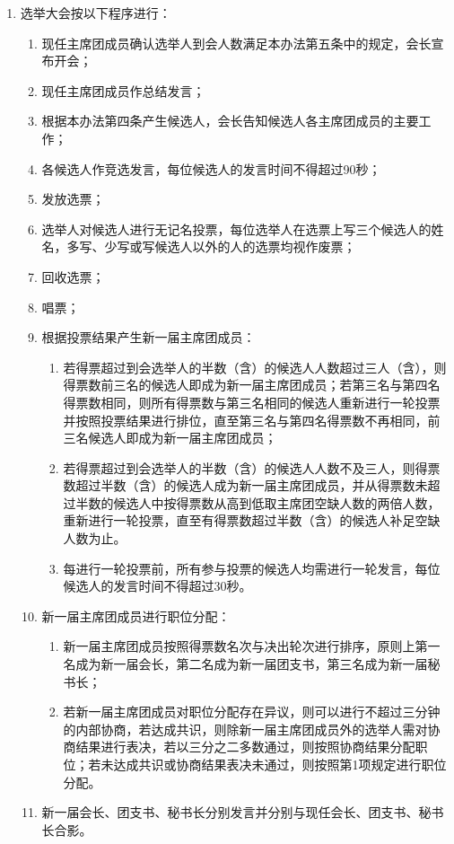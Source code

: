 \begin{enumerate}[resume]
    \item 选举大会按以下程序进行：
    
    \begin{enumerate}
        \item 现任主席团成员确认选举人到会人数满足本办法第五条中的规定，会长宣布开会；
        \item 现任主席团成员作总结发言；
        \item 根据本办法第四条产生候选人，会长告知候选人各主席团成员的主要工作；
        \item 各候选人作竞选发言，每位候选人的发言时间不得超过90秒；
        \item 发放选票；
        \item 选举人对候选人进行无记名投票，每位选举人在选票上写三个候选人的姓名，多写、少写或写候选人以外的人的选票均视作废票；
        \item 回收选票；
        \item 唱票；
        \item 根据投票结果产生新一届主席团成员：
        
        \begin{enumerate}
            \item 若得票超过到会选举人的半数（含）的候选人人数超过三人（含），则得票数前三名的候选人即成为新一届主席团成员；若第三名与第四名得票数相同，则所有得票数与第三名相同的候选人重新进行一轮投票并按照投票结果进行排位，直至第三名与第四名得票数不再相同，前三名候选人即成为新一届主席团成员；
            \item 若得票超过到会选举人的半数（含）的候选人人数不及三人，则得票数超过半数（含）的候选人成为新一届主席团成员，并从得票数未超过半数的候选人中按得票数从高到低取主席团空缺人数的两倍人数，重新进行一轮投票，直至有得票数超过半数（含）的候选人补足空缺人数为止。
            \item 每进行一轮投票前，所有参与投票的候选人均需进行一轮发言，每位候选人的发言时间不得超过30秒。
        \end{enumerate}
        
        \item 新一届主席团成员进行职位分配：
        
        \begin{enumerate}
            \item 新一届主席团成员按照得票数名次与决出轮次进行排序，原则上第一名成为新一届会长，第二名成为新一届团支书，第三名成为新一届秘书长；
            \item 若新一届主席团成员对职位分配存在异议，则可以进行不超过三分钟的内部协商，若达成共识，则除新一届主席团成员外的选举人需对协商结果进行表决，若以三分之二多数通过，则按照协商结果分配职位；若未达成共识或协商结果表决未通过，则按照第1项规定进行职位分配。
        \end{enumerate}

        \item 新一届会长、团支书、秘书长分别发言并分别与现任会长、团支书、秘书长合影。
    \end{enumerate}

\end{enumerate}

